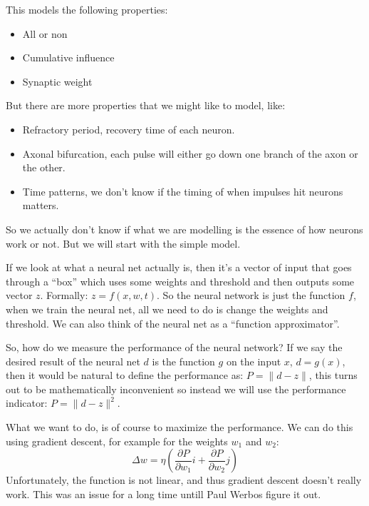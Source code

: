     This models the following properties:
    \begin{itemize}
        \item All or non
        \item Cumulative influence
        \item Synaptic weight
    \end{itemize}
    But there are more properties that we might like to model, like:
    \begin{itemize}
        \item Refractory period, recovery time of each neuron.
        \item Axonal bifurcation, each pulse will either go down one branch of 
        the axon or the other.
        \item Time patterns, we don't know if the timing of when impulses hit 
        neurons matters.
    \end{itemize}
    So we actually don't know if what we are modelling is the essence of how 
    neurons work or not. But we will start with the simple model.
    
    If we look at what a neural net actually is, then it's a vector of input 
    that goes through a ``box'' which uses some weights and threshold and then 
    outputs some vector $z$. Formally: $z = f(x,w,t)$. So the neural network is 
    just the function $f$, when we train the neural net, all we need to do is 
    change the weights and threshold. We can also think of the neural net as a 
    ``function approximator''.
    
    So, how do we measure the performance of the neural network? If we say the 
    desired result of the neural net $d$ is the function $g$ on the input 
    $x$, $d=g(x)$, then it would be natural to define the performance as: 
    $P=\|d-z\|$, this turns out to be mathematically inconvenient so instead we 
    will use the performance indicator: $P=\|d-z\|^2$.
    
    What we want to do, is of course to maximize the performance. We can do 
    this using gradient descent, for example for the weights $w_1$ and $w_2$:
    \begin{equation*}
        \Delta w= \eta \left(\frac{\partial P}{\partial w_1}i+\frac{\partial 
        P}{\partial w_2}j\right)
    \end{equation*}
    Unfortunately, the function is not linear, and thus gradient descent 
    doesn't really work. This was an issue for a long time untill Paul Werbos 
    figure it out.
    
